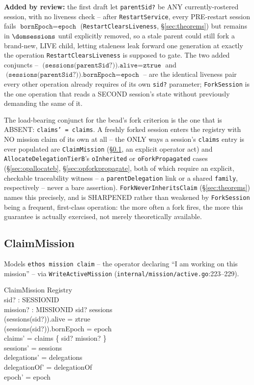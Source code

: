 \documentclass[a4paper,10pt,fleqn]{article}
\newcommand{\fpath}[1]{\texttt{#1}}
\newcommand{\field}[1]{\texttt{#1}}
\begin{document}
\textbf{Added by review:} the first draft let \field{parentSid?} be
ANY currently-rostered session, with no liveness check -- after
\field{RestartService}, every PRE-restart session fails
$\field{bornEpoch} = \field{epoch}$ (\field{RestartClearsLiveness},
\S\ref{sec:theorems}) but remains in $\dom \field{sessions}$ until
explicitly removed, so a stale parent could still fork a brand-new,
LIVE child, letting staleness leak forward one generation at exactly
the operation \field{RestartClearsLiveness} is supposed to gate. The
two added conjuncts -- $\field{(sessions(parentSid?)).alive} = \field{ztrue}$
and $\field{(sessions(parentSid?)).bornEpoch} = \field{epoch}$ -- are
the identical liveness pair every other operation already requires of
its own \field{sid?} parameter; \field{ForkSession} is the one
operation that reads a SECOND session's state without previously
demanding the same of it.

The load-bearing conjunct for the bead's fork criterion is the one that
is ABSENT: \field{claims' = claims}. A freshly forked session enters
the registry with NO mission claim of its own at all -- the ONLY ways a
session's \field{claims} entry is ever populated are
\field{ClaimMission} (\S\ref{sec:opclaim}, an explicit operator act)
and \field{AllocateDelegationTierB}'s \field{oInherited} or
\field{oForkPropagated} cases (\S\ref{sec:opallocateb},
\S\ref{sec:opforkpropagate}, both of which require an explicit,
checkable traceability witness -- a \field{parentDelegation} link or a
shared \field{family}, respectively -- never a bare assertion).
\field{ForkNeverInheritsClaim} (\S\ref{sec:theorems}) names this
precisely, and is SHARPENED rather than weakened by \field{ForkSession}
being a frequent, first-class operation: the more often a fork fires,
the more this guarantee is actually exercised, not merely
theoretically available.

\subsection{ClaimMission}
\label{sec:opclaim}

Models \field{ethos mission claim} -- the operator declaring ``I am
working on this mission'' -- via \field{WriteActiveMission}
(\fpath{internal/mission/active.go}:223--229).

\begin{schema}{ClaimMission}
\Delta Registry \\
sid? : SESSIONID \\
mission? : MISSIONID
\where
sid? \in \dom sessions \\
(sessions(sid?)).alive = ztrue \\
(sessions(sid?)).bornEpoch = epoch \\
claims' = claims \oplus \{ sid? \mapsto mission? \} \\
sessions' = sessions \\
delegations' = delegations \\
delegationOf' = delegationOf \\
epoch' = epoch
\end{schema}
\end{document}
